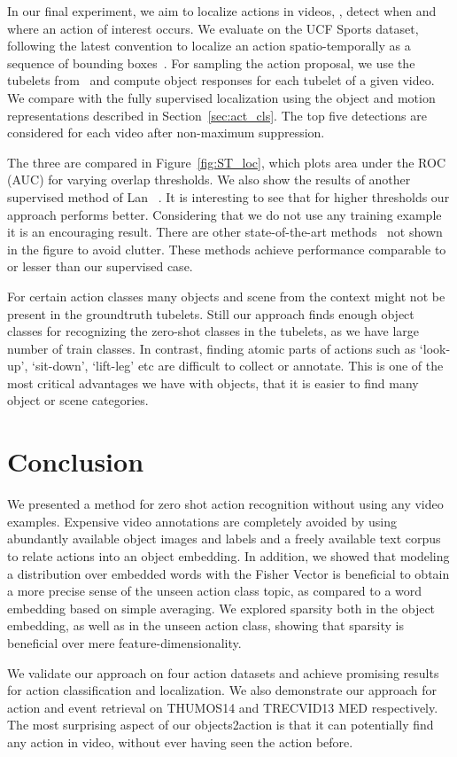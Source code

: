 In our final experiment, we aim to localize actions in videos, \ie, detect when and where an action of interest occurs.
We evaluate on the UCF Sports dataset, following the latest convention to localize an action spatio-temporally as a sequence of bounding boxes~\cite{Jain:tubelets,tian_iccv11,Yicong:sdpm}.
For sampling the action proposal, we use the tubelets from~\cite{Jain:tubelets} and compute object responses for each tubelet of a given video. 
We compare with the fully supervised localization using the object and motion representations described in Section~\ref{sec:act_cls}.
The top five detections are considered for each video after non-maximum suppression. 

The three are compared in Figure~\ref{fig:ST_loc}, which plots area under the ROC (AUC) for varying overlap thresholds. 
We also show the results of another supervised method of Lan \etal~\cite{tian_iccv11}. It is interesting to see that for higher thresholds our approach performs better. Considering that we 
do not use any training example it is an encouraging result.
There are other state-of-the-art methods~\cite{Jain_15kObjAct,Jain:tubelets,Yicong:sdpm} not shown in the figure to avoid clutter. These methods achieve performance comparable to or lesser than
our supervised case.

For certain action classes many objects and scene from the context might not be present in the groundtruth tubelets. Still our approach finds enough object classes for recognizing the zero-shot classes in the tubelets, as we have large number of train classes. 
In contrast, finding atomic parts of actions such as `look-up', `sit-down', `lift-leg' etc are difficult to collect or annotate.
This is one of the most critical advantages we have with objects, that it is easier to find many object or scene categories.  



\section{Conclusion} 
We presented a method for zero shot action recognition without using any video examples. Expensive video annotations are completely avoided by using abundantly available object images and labels and a freely available text corpus to relate actions into an object embedding. In addition, we showed that modeling a distribution over embedded words with the Fisher Vector is beneficial to obtain a more precise sense of the unseen action class topic, as compared to a word embedding based on simple averaging. We explored sparsity both in the object embedding, as well as in the unseen action class, showing that sparsity is beneficial over mere feature-dimensionality. 

{We validate our approach on four action datasets and achieve promising results for action classification and localization. We also demonstrate our approach for action and event retrieval on THUMOS14 and TRECVID13 MED respectively.}
The most surprising aspect of our objects2action is that it can potentially find any action in video, without ever having seen the action before.

